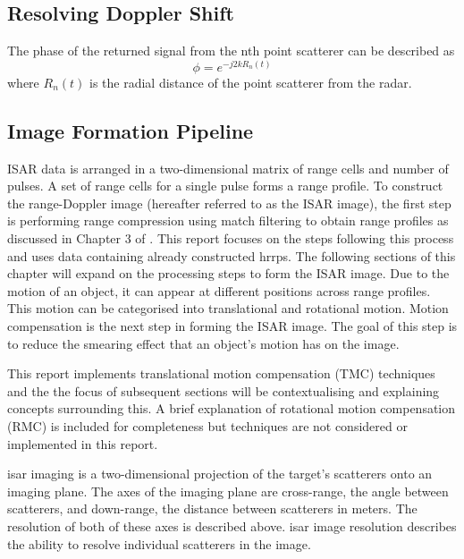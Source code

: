 \documentclass[class=report,11pt,crop=false]{standalone}
\begin{document}
    \subsection{Resolving Doppler Shift}
    The phase of the returned signal from the nth point scatterer can be described as
    \begin{equation}
        \phi = e^{-j2kR_n(t)}
    \end{equation}
    where $R_n(t)$ is the radial distance of the point scatterer from the radar.

    \subsection{Image Formation Pipeline}
    ISAR data is arranged in a two-dimensional matrix of range cells and number of pulses. A set of range cells for a single pulse forms a range profile. To construct the range-Doppler image (hereafter referred to as the ISAR image), the first step is performing range compression using match filtering to obtain range profiles as discussed in Chapter 3 of \cite{ISARtextbook_Martorella}. This report focuses on the steps following this process and uses data containing already constructed \gls{hrrp}s. The following sections of this chapter will expand on the processing steps to form the ISAR image. Due to the motion of an object, it can appear at different positions across range profiles. This motion can be categorised into translational and rotational motion. Motion compensation is the next step in forming the ISAR image. The goal of this step is to reduce the smearing effect that an object's motion has on the image. %
    
    This report implements translational motion compensation (TMC) techniques and the the focus of subsequent sections will be contextualising and explaining concepts surrounding this. A brief explanation of rotational motion compensation (RMC) is included for completeness but techniques are not considered or implemented in this report. 
    
    \gls{isar} imaging is a two-dimensional projection of the target's scatterers onto an imaging plane. The axes of the imaging plane are cross-range, the angle between scatterers, and down-range, the distance between scatterers in meters. %
    The resolution of both of these axes is described above.
    \gls{isar} image resolution describes the ability to resolve individual scatterers in the image. %
    
\end{document}
